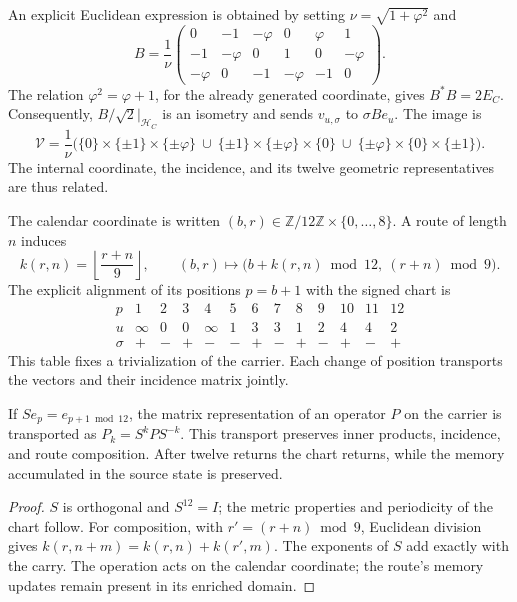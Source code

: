 An explicit Euclidean expression is obtained by setting
\(\nu=\sqrt{1+\varphi^2}\) and
\[
 B=\frac1\nu
 \begin{pmatrix}
 0&-1&-\varphi&0&\varphi&1\\
 -1&-\varphi&0&1&0&-\varphi\\
 -\varphi&0&-1&-\varphi&-1&0
 \end{pmatrix}.
\]
The relation \(\varphi^2=\varphi+1\), for the already generated coordinate,
gives \(B^*B=2E_C\).
Consequently, \(B/\sqrt2|_{\mathcal H_C}\) is an isometry and sends
\(v_{u,\sigma}\) to \(\sigma Be_u\). The image is
\[
 \mathcal V=\frac1\nu\bigl(
 \{0\}\times\{\pm1\}\times\{\pm\varphi\}\ \cup\
 \{\pm1\}\times\{\pm\varphi\}\times\{0\}\ \cup\
 \{\pm\varphi\}\times\{0\}\times\{\pm1\}\bigr).
\]
The internal coordinate, the incidence, and its twelve geometric
representatives are thus related.

The calendar coordinate is written \((b,r)\in
\mathbb Z/12\mathbb Z\times\{0,\ldots,8\}\). A route of length \(n\)
induces
\[
 k(r,n)=\left\lfloor\frac{r+n}{9}\right\rfloor,\qquad
 (b,r)\longmapsto
 \bigl(b+k(r,n)\bmod12,\ (r+n)\bmod9\bigr).
\]
The explicit alignment of its positions \(p=b+1\) with the signed chart is
\[
\begin{array}{c|rrrrrrrrrrrr}
p&1&2&3&4&5&6&7&8&9&10&11&12\\ \hline
u&\infty&0&0&\infty&1&3&3&1&2&4&4&2\\
\sigma&+&-&+&-&-&+&-&+&-&+&-&+
\end{array}
\]
This table fixes a trivialization of the carrier. Each change of position
transports the vectors and their incidence matrix jointly.

\begin{proposition}
If \(S e_p=e_{p+1\bmod12}\), the matrix representation of an
operator \(P\) on the carrier is transported as \(P_k=S^kPS^{-k}\).
This transport preserves inner products, incidence, and route
composition. After twelve returns the chart returns, while the memory
accumulated in the source state is preserved.
\end{proposition}
\begin{proof}
\(S\) is orthogonal and \(S^{12}=I\); the metric properties and
periodicity of the chart follow. For composition, with
\(r'=(r+n)\bmod9\), Euclidean division gives
\(k(r,n+m)=k(r,n)+k(r',m)\). The exponents of \(S\) add
exactly with the carry. The operation acts on the calendar
coordinate; the route's memory updates remain
present in its enriched domain.
\end{proof}

